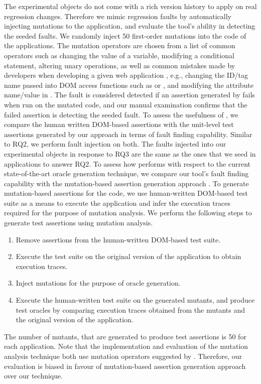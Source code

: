 The experimental objects do not come with a rich version history to apply \tool on real regression changes. Therefore we mimic regression faults by automatically injecting mutations to the application, and evaluate the tool's ability in detecting the seeded faults. We randomly inject 50 first-order mutations into the \javascript code of the applications. The mutation operators are chosen from a list of common operators such as changing the value of a variable, modifying a conditional statement, altering unary operations, as well as common mistakes made by developers when developing a given web application \cite{mirshokraie:tse15}, e.g., changing the ID/tag name passed into DOM access functions such as  or , and modifying the attribute name/value in . The fault is considered detected if an assertion generated by \tool fails when run on the mutated code, and our manual examination confirms that the failed assertion is detecting the seeded fault.
 To assess the usefulness of \tool, we compare the human written DOM-based assertions with the unit-level test assertions generated by our approach in terms of fault finding capability.
Similar to RQ2, we perform fault injection on both.
The faults injected into our experimental objects in response to RQ3 are the same as the ones that we seed in applications to answer RQ2.
 To assess how \tool performs with respect to the current state-of-the-art oracle generation technique, we compare our tool's fault finding capability with the mutation-based assertion generation approach \cite{mirshokraie:icst15, fraser:tse12}. To generate mutation-based assertions for the \javascript code, we use human-written DOM-based test suite as a means to execute the application and infer the execution traces required for the purpose of mutation analysis. We perform the following steps to generate test assertions using mutation analysis.
\begin{enumerate}
\item Remove assertions from the human-written DOM-based test suite.
\item Execute the test suite on the original version of the application to obtain execution traces.
\item Inject mutations for the purpose of oracle generation.
\item Execute the human-written test suite on the generated mutants, and produce test oracles by comparing execution traces obtained from the mutants and the original version of the application.
\end{enumerate}
The number of mutants, that are generated to produce test assertions is 50 for each application. Note that the implementation and evaluation of the mutation analysis technique both use mutation operators suggested by \cite{mirshokraie:tse15}. Therefore, our evaluation is biased in favour of mutation-based assertion generation approach over our technique.

 

